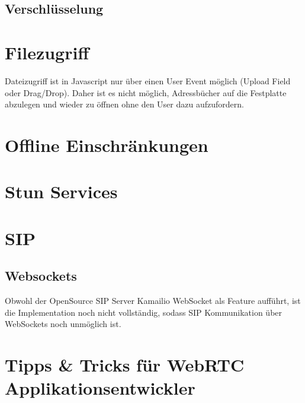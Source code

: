 		\subsection{Verschlüsselung}
	 	
	 
	 \section{Filezugriff}
	 	Dateizugriff ist in Javascript nur über einen User Event möglich (Upload Field oder Drag/Drop). Daher ist es nicht möglich, Adressbücher auf die Festplatte abzulegen und wieder zu öffnen ohne den User dazu aufzufordern.
	 	
	 
	 \section{Offline Einschränkungen}
	 	\section{Stun Services}
	 	
	 	
	 		
	 \section{SIP}
	 	\subsection{Websockets}
	 		Obwohl der OpenSource SIP Server Kamailio WebSocket als Feature aufführt, ist die Implementation noch nicht vollständig, sodass SIP Kommunikation über WebSockets noch unmöglich ist.


	\section{Tipps \& Tricks für WebRTC Applikationsentwickler}
		